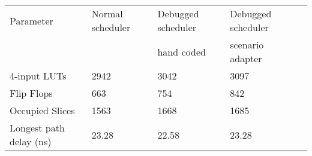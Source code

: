
\begin{tabular}{lllll}
\hline\noalign{\smallskip}
Parameter & Normal scheduler & Debugged scheduler & Debugged scheduler \\%
 &  &  hand coded & scenario adapter \\%
\noalign{\smallskip}
\hline
\noalign{\smallskip}
4-input LUTs & 2942 & 3042 & 3097 \\%
Flip Flops & 663 & 754 & 842 \\%
Occupied Slices & 1563 & 1668 & 1685 \\%
Longest path delay (ns) & 23.28 & 22.58 & 23.28 \\%
\hline
\end{tabular}
